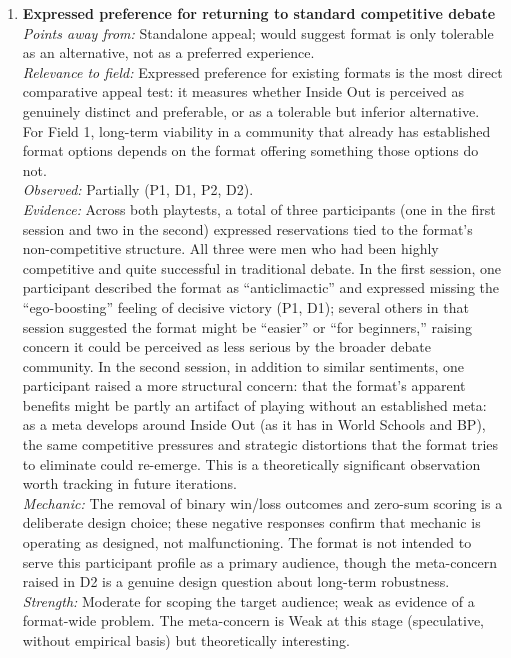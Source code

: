 \documentclass[12pt]{article}
\begin{document}
\begin{enumerate}
\item \textbf{Expressed preference for returning to standard competitive debate}\\
\textit{Points away from:} Standalone appeal; would suggest format is only tolerable as an alternative, not as a preferred experience.\\
\textit{Relevance to field:} Expressed preference for existing formats is the most direct comparative appeal test: it measures whether Inside Out is perceived as genuinely distinct and preferable, or as a tolerable but inferior alternative. For Field 1, long-term viability in a community that already has established format options depends on the format offering something those options do not.\\
\textit{Observed:} Partially (P1, D1, P2, D2).\\
\textit{Evidence:} Across both playtests, a total of three participants (one in the first session and two in the second) expressed reservations tied to the format's non-competitive structure. All three were men who had been highly competitive and quite successful in traditional debate. In the first session, one participant described the format as ``anticlimactic'' and expressed missing the ``ego-boosting'' feeling of decisive victory (P1, D1); several others in that session suggested the format might be ``easier'' or ``for beginners,'' raising concern it could be perceived as less serious by the broader debate community. In the second session, in addition to similar sentiments, one participant raised a more structural concern: that the format's apparent benefits might be partly an artifact of playing without an established meta: as a meta develops around Inside Out (as it has in World Schools and BP), the same competitive pressures and strategic distortions that the format tries to eliminate could re-emerge. This is a theoretically significant observation worth tracking in future iterations.\\
\textit{Mechanic:} The removal of binary win/loss outcomes and zero-sum scoring is a deliberate design choice; these negative responses confirm that mechanic is operating as designed, not malfunctioning. The format is not intended to serve this participant profile as a primary audience, though the meta-concern raised in D2 is a genuine design question about long-term robustness.\\
\textit{Strength:} Moderate for scoping the target audience; weak as evidence of a format-wide problem. The meta-concern is Weak at this stage (speculative, without empirical basis) but theoretically interesting.


\end{enumerate}
\end{document}
